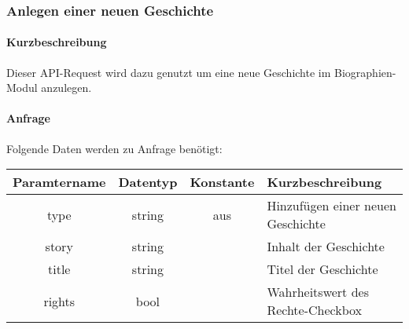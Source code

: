 \subsubsection{Anlegen einer neuen Geschichte}\label{api:NewStoryAdd}
\paragraph{Kurzbeschreibung}Dieser API-Request wird dazu genutzt um eine neue Geschichte im Biographien-Modul anzulegen.
\paragraph{Anfrage}Folgende Daten werden zu Anfrage benötigt:
\begin{table}[H]
	\begin{tabular}{|c|c|c|p{6.5cm}|}
		\hline
		\textbf{Paramtername} & \textbf{Datentyp} & \textbf{Konstante} & \textbf{Kurzbeschreibung}                                                                                               \\ \hline
		type                & string            & aus                & Hinzufügen einer neuen Geschichte \\ \hline
		story               & string            &                    & Inhalt der Geschichte \\ \hline
		title               & string            &                    & Titel der Geschichte \\ \hline
		rights              & bool              &                    & Wahrheitswert des Rechte-Checkbox \\ \hline
	\end{tabular}
\end{table}
